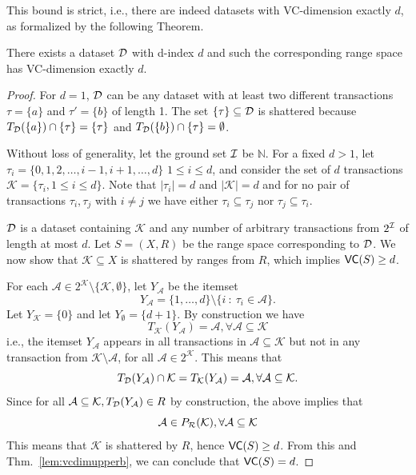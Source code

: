 This bound is strict, i.e., there are indeed datasets with VC-dimension exactly
$d$, as formalized by the following Theorem.

\begin{theorem}\label{lem:vcdimlowerb}
  There exists a dataset ${\cal D}$ with d-index $d$ and such the corresponding range
  space has VC-dimension exactly $d$.
\end{theorem}

\begin{proof}
  For $d=1$, ${\cal D}$ can be any dataset with at least two different transactions
  $\tau=\{a\}$ and $\tau'=\{b\}$ of length 1. The set $\{\tau\}\subseteq{\cal D}$ is
  shattered because $T_{\cal D}(\{a\})\cap\{\tau\}=\{\tau\}$ and
  $T_{\cal D}(\{b\})\cap\{\tau\}=\emptyset$.

  Without loss of generality, let the ground set ${\cal I}$ be $\mathbb{N}$. For a
  fixed $d>1$, let $\tau_i=\{0,1,2,\dots,i-1,i+1,\dots,d\}$
  $1\le i\le d$, and consider the set of $d$ transactions $\mathcal{K}=\{\tau_i,
  1\le i\le d\}$.  Note that $|\tau_i|=d$ and $|\mathcal{K}|=d$ and for no pair
  of transactions $\tau_i,\tau_j$ with $i\neq j$ we have either
  $\tau_i\subseteq\tau_j$ nor $\tau_j\subseteq\tau_i$.
  
  ${\cal D}$ is a dataset containing $\mathcal{K}$ and any number of arbitrary
  transactions from $2^{\cal I}$ of length at most $d$. Let $S=(X,R)$ be the range
  space corresponding to ${\cal D}$. We now show that $\mathcal{K}\subseteq X$ is
  shattered by ranges from $R$, which implies
  $\mathsf{VC}(S)\ge d$. 
  
  For each $\mathcal{A}\in 2^\mathcal{K}\setminus\{\mathcal{K},\emptyset\}$, let
  $Y_\mathcal{A}$ be the itemset 
  \[ 
  Y_\mathcal{A}=\{1,\dots,d\}\setminus \{i ~:~
  \tau_i \in \mathcal{A}\}.
  \]
  Let $Y_\mathcal{K}=\{0\}$ and let $Y_\emptyset=\{d+1\}$. By construction we
  have
  \[
  T_\mathcal{K}(Y_\mathcal{A})=\mathcal{A}, \forall \mathcal{A}\subseteq\mathcal{K}
  \]
  i.e., the itemset $Y_\mathcal{A}$ appears in all transactions in $\mathcal{A}\subseteq \mathcal{K}$
  but not in any transaction from $\mathcal{K}\setminus\mathcal{A}$, for all $\mathcal{A}\in 2^{\mathcal{K}}$. This means that
  \[
  T_{\cal D}(Y_\mathcal{A})\cap \mathcal{K} = T_\mathcal{K}(Y_\mathcal{A}) =
  \mathcal{A}, \forall \mathcal{A}\subseteq\mathcal{K}.
  \]
  Since for all $\mathcal{A}\subseteq\mathcal{K}, T_{\cal D}(Y_\mathcal{A})\in R$ by
  construction, the above implies that
  \[
  \mathcal{A}\in P_{\mathcal{R}}(\mathcal{K}), \forall \mathcal{A}\subseteq\mathcal{K}
  \]
  This means that $\mathcal{K}$ is shattered by $R$, hence $\mathsf{VC}(S)\ge d$. From
  this and Thm.~\ref{lem:vcdimupperb}, we can conclude that $\mathsf{VC}(S)=d$.
\end{proof}

